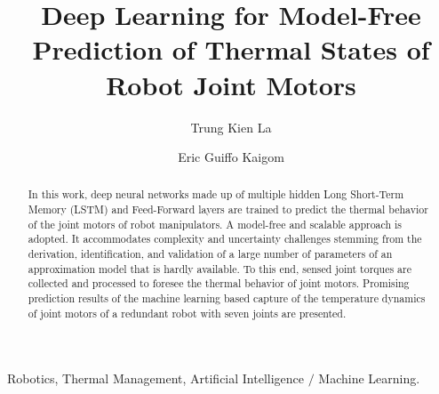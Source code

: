 \documentclass{ifacconf}
\begin{document}
\begin{frontmatter}

\title{Deep Learning for Model-Free Prediction of  Thermal States of Robot Joint Motors} 


\author[First]{Trung Kien La} 
\author[First]{Eric Guiffo Kaigom} 

\address[First]{Department of Computer Science \& Engineering,
Frankfurt University of Applied Sciences, 60318 Frankfurt am Main, Germany (e-mails: trung.la@stud.fra-uas.de; kaigom@fb2.fra-uas.de).}

\begin{abstract}                %
	In this work, deep neural networks made up of multiple hidden Long Short-Term Memory (LSTM) and Feed-Forward  layers are trained to predict the  thermal behavior of the joint motors of robot manipulators. A model-free and scalable approach  is adopted. It accommodates   complexity and uncertainty challenges stemming from the derivation, identification, and validation of a large number of  parameters of an approximation model that is hardly available. To this end, sensed joint torques are  collected  and processed  to foresee the thermal behavior of joint motors. Promising prediction results of the machine learning based capture of the temperature dynamics of joint motors of a redundant robot with seven joints are presented. 
\end{abstract}

\begin{keyword}
Robotics, Thermal Management, Artificial Intelligence $\slash$ Machine Learning.
\end{keyword}

\end{frontmatter}
\end{document}
